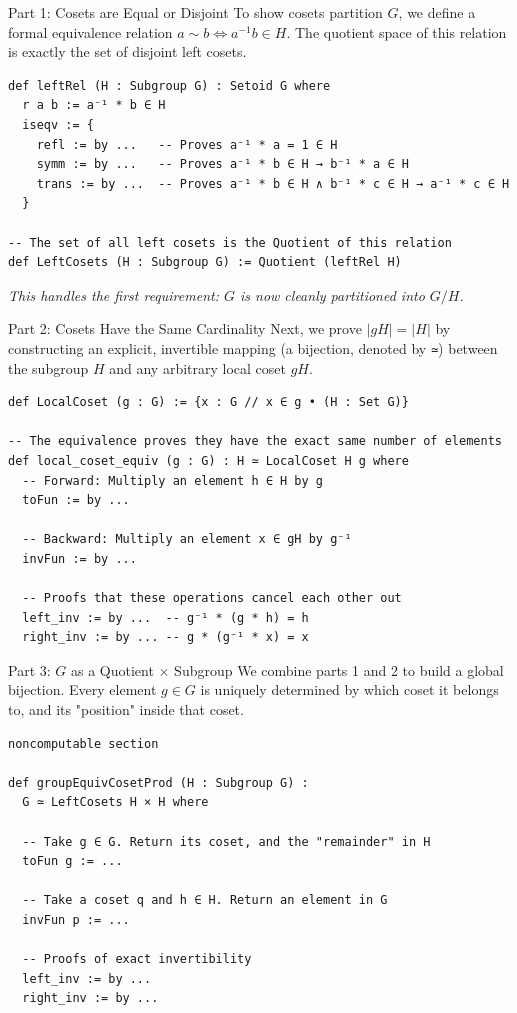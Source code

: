 \documentclass{beamer}
\begin{document}
\begin{frame}[fragile]{Part 1: Cosets are Equal or Disjoint}
    To show cosets partition $G$, we define a formal equivalence relation $a \sim b \iff a^{-1}b \in H$. The quotient space of this relation is exactly the set of disjoint left cosets.

\begin{lstlisting}
def leftRel (H : Subgroup G) : Setoid G where
  r a b := a⁻¹ * b ∈ H
  iseqv := {
    refl := by ...   -- Proves a⁻¹ * a = 1 ∈ H
    symm := by ...   -- Proves a⁻¹ * b ∈ H → b⁻¹ * a ∈ H
    trans := by ...  -- Proves a⁻¹ * b ∈ H ∧ b⁻¹ * c ∈ H → a⁻¹ * c ∈ H
  }

-- The set of all left cosets is the Quotient of this relation
def LeftCosets (H : Subgroup G) := Quotient (leftRel H)
\end{lstlisting}
    
    \vspace{0.2cm}
    \textit{This handles the first requirement: $G$ is now cleanly partitioned into $G/H$.}
\end{frame}

\begin{frame}[fragile]{Part 2: Cosets Have the Same Cardinality}
    Next, we prove $|gH| = |H|$ by constructing an explicit, invertible mapping (a bijection, denoted by \texttt{≃}) between the subgroup $H$ and any arbitrary local coset $gH$.

\begin{lstlisting}
def LocalCoset (g : G) := {x : G // x ∈ g • (H : Set G)}

-- The equivalence proves they have the exact same number of elements
def local_coset_equiv (g : G) : H ≃ LocalCoset H g where
  -- Forward: Multiply an element h ∈ H by g
  toFun := by ... 
  
  -- Backward: Multiply an element x ∈ gH by g⁻¹
  invFun := by ...
  
  -- Proofs that these operations cancel each other out
  left_inv := by ...  -- g⁻¹ * (g * h) = h
  right_inv := by ... -- g * (g⁻¹ * x) = x
\end{lstlisting}
\end{frame}

\begin{frame}[fragile]{Part 3: $G$ as a Quotient $\times$ Subgroup}
    We combine parts 1 and 2 to build a global bijection. Every element $g \in G$ is uniquely determined by which coset it belongs to, and its "position" inside that coset.

\begin{lstlisting}
noncomputable section

def groupEquivCosetProd (H : Subgroup G) : 
  G ≃ LeftCosets H × H where
  
  -- Take g ∈ G. Return its coset, and the "remainder" in H
  toFun g := ... 
  
  -- Take a coset q and h ∈ H. Return an element in G
  invFun p := ...
  
  -- Proofs of exact invertibility
  left_inv := by ...
  right_inv := by ...
\end{lstlisting}
\end{frame}
\end{document}
